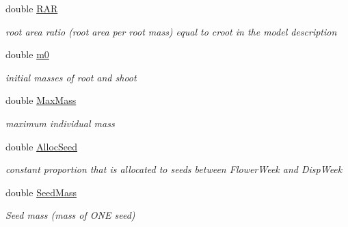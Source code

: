\begin{DoxyCompactItemize}
\mbox{\label{class_s_pft_traits_a9ccddac1b8b23fef2877358ae5d437f2}} 
double \mbox{\hyperlink{class_s_pft_traits_a9ccddac1b8b23fef2877358ae5d437f2}{R\+AR}}
\begin{DoxyCompactList}\small\item\em root area ratio (root area per root mass) equal to croot in the model description \end{DoxyCompactList}\item 
\mbox{\label{class_s_pft_traits_a76c5874c85567183b15a13674e534aca}} 
double \mbox{\hyperlink{class_s_pft_traits_a76c5874c85567183b15a13674e534aca}{m0}}
\begin{DoxyCompactList}\small\item\em initial masses of root and shoot \end{DoxyCompactList}\item 
\mbox{\label{class_s_pft_traits_a04103d3034330444141c2761d1dd53be}} 
double \mbox{\hyperlink{class_s_pft_traits_a04103d3034330444141c2761d1dd53be}{Max\+Mass}}
\begin{DoxyCompactList}\small\item\em maximum individual mass \end{DoxyCompactList}\item 
\mbox{\label{class_s_pft_traits_a32918473478e469e7e3a26bd3d9b1acd}} 
double \mbox{\hyperlink{class_s_pft_traits_a32918473478e469e7e3a26bd3d9b1acd}{Alloc\+Seed}}
\begin{DoxyCompactList}\small\item\em constant proportion that is allocated to seeds between Flower\+Week and Disp\+Week \end{DoxyCompactList}\item 
\mbox{\label{class_s_pft_traits_a047dfe2892cc9a321b1cd6a99f69bd18}} 
double \mbox{\hyperlink{class_s_pft_traits_a047dfe2892cc9a321b1cd6a99f69bd18}{Seed\+Mass}}
\begin{DoxyCompactList}\small\item\em Seed mass (mass of O\+NE seed) \end{DoxyCompactList}\item 
\mbox{\label{class_s_pft_traits_adcfae284d5d7d0ca0f4be2190c659966}} 

\end{DoxyCompactItemize}
